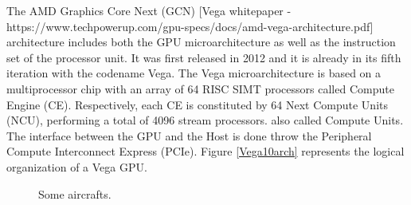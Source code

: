The AMD Graphics Core Next (GCN) [Vega whitepaper - https://www.techpowerup.com/gpu-specs/docs/amd-vega-architecture.pdf] architecture includes both the GPU microarchitecture as well as the instruction set of the processor unit. It was first released in 2012 and it is already in its fifth iteration with the codename Vega. The Vega microarchitecture is based on a multiprocessor chip with an array of 64 RISC SIMT processors called Compute Engine (CE). Respectively, each CE is constituted by 64 Next Compute Units (NCU), performing a total of 4096 stream processors. also called Compute Units. The interface between the GPU and the Host is done throw the Peripheral Compute Interconnect Express (PCIe). Figure \ref{Vega10arch} represents the logical organization of a Vega GPU. 

\begin{figure}[!htb]
  \begin{subfigmatrix}{2}
  \end{subfigmatrix}
  \caption{Some aircrafts.}
  \label{fig:Vega10arch}
\end{figure}

